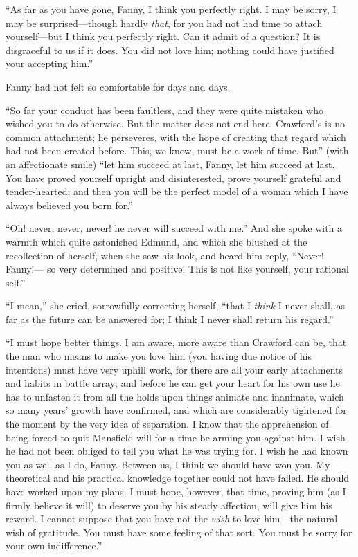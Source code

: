 \documentclass{article}
\begin{document}
``As far as you have gone, Fanny, I think you perfectly right.
I may be sorry, I may be surprised---though hardly \emph{that},
for you had not had time to attach yourself---but I think
you perfectly right.  Can it admit of a question?
It is disgraceful to us if it does.  You did not love him;
nothing could have justified your accepting him.''

Fanny had not felt so comfortable for days and days.

``So far your conduct has been faultless, and they were quite
mistaken who wished you to do otherwise.  But the matter
does not end here.  Crawford's is no common attachment;
he perseveres, with the hope of creating that regard
which had not been created before.  This, we know,
must be a work of time.  But'' (with an affectionate smile)
``let him succeed at last, Fanny, let him succeed at last.
You have proved yourself upright and disinterested,
prove yourself grateful and tender-hearted; and then you
will be the perfect model of a woman which I have always
believed you born for.''

``Oh! never, never, never! he never will succeed with me.''
And she spoke with a warmth which quite astonished Edmund,
and which she blushed at the recollection of herself,
when she saw his look, and heard him reply, ``Never!  Fanny!---%
so very determined and positive!  This is not like yourself,
your rational self.''

``I mean,'' she cried, sorrowfully correcting herself,
``that I \emph{think} I never shall, as far as the future can
be answered for; I think I never shall return his regard.''

``I must hope better things.  I am aware, more aware
than Crawford can be, that the man who means to make
you love him (you having due notice of his intentions)
must have very uphill work, for there are all your early
attachments and habits in battle array; and before he
can get your heart for his own use he has to unfasten it
from all the holds upon things animate and inanimate,
which so many years' growth have confirmed, and which are
considerably tightened for the moment by the very idea
of separation.  I know that the apprehension of being
forced to quit Mansfield will for a time be arming you
against him.  I wish he had not been obliged to tell you
what he was trying for.  I wish he had known you as well as
I do, Fanny.  Between us, I think we should have won you.
My theoretical and his practical knowledge together could
not have failed.  He should have worked upon my plans.
I must hope, however, that time, proving him (as I firmly
believe it will) to deserve you by his steady affection,
will give him his reward.  I cannot suppose that you have
not the \emph{wish} to love him---the natural wish of gratitude.
You must have some feeling of that sort.  You must be sorry
for your own indifference.''
\end{document}
